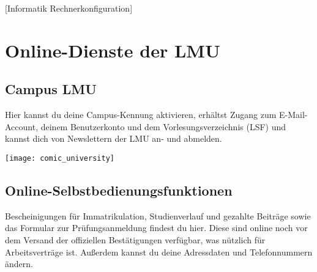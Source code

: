 
\begin{urlList}
	[Informatik Rechnerkonfiguration]
\end{urlList}

\section{Online-Dienste der LMU}
\label{sec:online}
\subsection*{Campus LMU}

Hier kannst du deine Campus-Kennung aktivieren, erhältst Zugang zum E-Mail-Account, deinem Benutzerkonto und dem Vorlesungsverzeichnis (LSF) und kannst dich von Newslettern der LMU an- und abmelden.


\begin{urlList}
\end{urlList}

\begin{center}
	{\texttt{[image: comic\_university]}}
\end{center}

\subsection*{Online-Selbstbedienungsfunktionen}

Bescheinigungen für Immatrikulation, Studienverlauf und gezahlte Beiträge sowie das Formular zur Prüfungsanmeldung findest du hier. Diese sind online noch vor dem Versand der offiziellen Bestätigungen verfügbar, was nützlich für Arbeitsverträge ist. Außerdem kannst du deine Adressdaten und Telefonnummern ändern.

